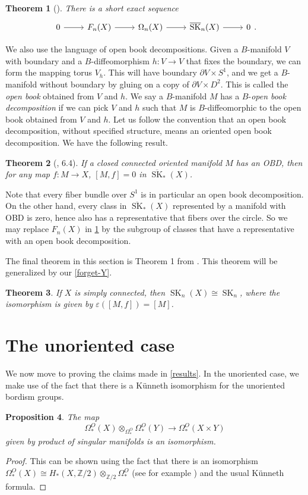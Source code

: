\documentclass{amsart}
\newtheorem{thm}{Theorem}[section]
\newtheorem{prop}[thm]{Proposition}
\theoremstyle{definition}
\theoremstyle{remark}
\newcommand{\Z}{\mathbb{Z}}
\newcommand{\de}{\partial}
\newcommand{\SK}{\operatorname{SK}}
\newcommand{\bSK}{\overline{\SK}}
\begin{document}
\begin{thm}[{\cite[Theorem 1.2]{skbook}}]
\label{skbook1.2}
    There is a short exact sequence
    \[\begin{tikzcd}
    0 \arrow[r] & F_n(X) \arrow[r] & \Omega_n(X) \arrow[r] & \bSK_n(X) \arrow[r] & 0
    \end{tikzcd}.\]
\end{thm}

We also use the language of open book decompositions. Given a $B$-manifold $V$ with boundary and a $B$-diffeomorphism $h:V\to V$ that fixes the boundary, we can form the mapping torus $V_h$. This will have boundary $\de V \times S^1$, and we get a $B$-manifold without boundary by gluing on a copy of $\de V\times D^2$. This is called the \textit{open book} obtained from $V$ and $h$. We say a $B$-manifold $M$ has a $B$-\textit{open book decomposition} if we can pick $V$ and $h$ such that $M$ is $B$-diffeomorphic to the open book obtained from $V$ and $h$. Let us follow the convention that an open book decomposition, without specified structure, means an oriented open book decomposition. We have the following result.

\begin{thm}[\cite{skbook}, 6.4]
    If a closed connected oriented manifold $M$ has an OBD, then for any map $f:M\to X$, $[M,f] = 0$ in $\bSK_*(X)$.
\end{thm}

Note that every fiber bundle over $S^1$ is in particular an open book decomposition. On the other hand, every class in $\bSK_*(X)$ represented by a manifold with OBD is zero, hence also has a representative that fibers over the circle. So we may replace $F_n(X)$ in \cref{skbook1.2} by the subgroup of classes that have a representative with an open book decomposition.

The final theorem in this section is Theorem 1 from \cite{neumann1975}. This theorem will be generalized by our \cref{forget-Y}.

\begin{thm}
\label{forget-X}
    If $X$ is simply connected, then $\SK_n(X) \cong \SK_n$, where the isomorphism is given by $\varepsilon([M,f]) = [M]$.
\end{thm}

\section{The unoriented case} \label{section-unori}
We now move to proving the claims made in \cref{results}. In the unoriented case, we make use of the fact that there is a K\"unneth isomorphism for the unoriented bordism groups.
\begin{prop}
\label{kunneth-O}
    The map \[\Omega_*^O(X)\otimes_{\Omega_*^O}\Omega_*^O(Y)\to \Omega_*^O(X\times Y)\]
    given by product of singular manifolds is an isomorphism.
\end{prop}
\begin{proof}
    This can be shown using the fact that there is an isomorphism $\Omega_*^O(X)\cong H_*(X,\Z/2)\otimes_{\Z/2}\Omega_*^O$ (see for example \cite{conner1962differentiable}) and the usual K\"unneth formula.
\end{proof}
\end{document}
